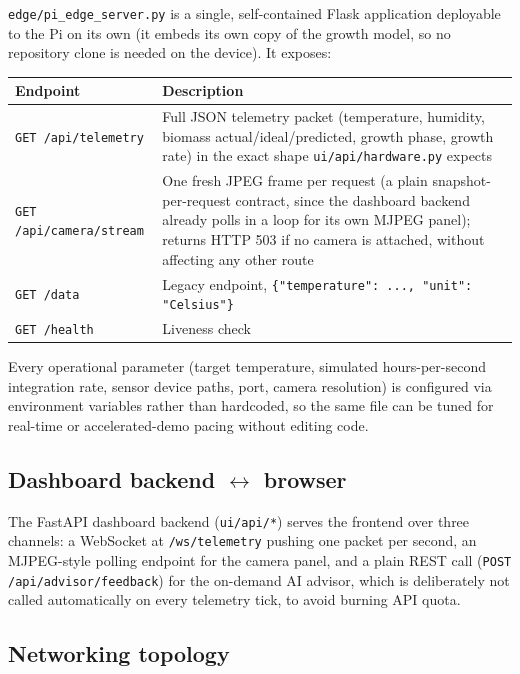 \documentclass[11pt]{article}
\begin{document}
\texttt{edge/pi\_edge\_server.py} is a single, self-contained Flask application deployable to the Pi on its own (it embeds its own copy of the growth model, so no repository clone is needed on the device). It exposes:

\begin{center}
\begin{tabular}{@{}p{4.2cm}p{9.3cm}@{}}
\toprule
\textbf{Endpoint} & \textbf{Description} \\
\midrule
\texttt{GET /api/telemetry} & Full JSON telemetry packet (temperature, humidity, biomass actual/ideal/predicted, growth phase, growth rate) in the exact shape \texttt{ui/api/hardware.py} expects \\
\texttt{GET /api/camera/stream} & One fresh JPEG frame per request (a plain snapshot-per-request contract, since the dashboard backend already polls in a loop for its own MJPEG panel); returns HTTP 503 if no camera is attached, without affecting any other route \\
\texttt{GET /data} & Legacy endpoint, \texttt{\{"temperature": ..., "unit": "Celsius"\}} \\
\texttt{GET /health} & Liveness check \\
\bottomrule
\end{tabular}
\end{center}

Every operational parameter (target temperature, simulated hours-per-second integration rate, sensor device paths, port, camera resolution) is configured via environment variables rather than hardcoded, so the same file can be tuned for real-time or accelerated-demo pacing without editing code.

\subsection{Dashboard backend $\leftrightarrow$ browser}

The FastAPI dashboard backend (\texttt{ui/api/*}) serves the frontend over three channels: a WebSocket at \texttt{/ws/telemetry} pushing one packet per second, an MJPEG-style polling endpoint for the camera panel, and a plain REST call (\texttt{POST /api/advisor/feedback}) for the on-demand AI advisor, which is deliberately not called automatically on every telemetry tick, to avoid burning API quota.

\subsection{Networking topology}
\label{sec:networking-topology-ref}
\end{document}
